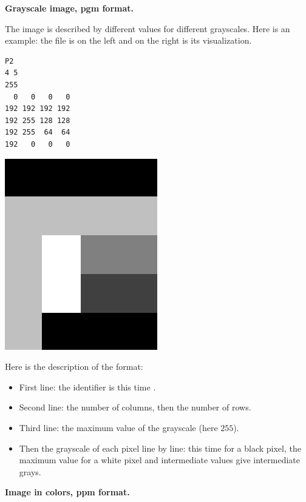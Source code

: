 \documentclass[11pt,class=report,crop=false]{standalone}
\begin{document}
\begin{cours}
\medskip

\textbf{Grayscale image, \og{}pgm\fg{} format.}

The image is described by different values for different grayscales.
Here is an example: the  file is on the left and on the right is its visualization.
\begin{center}
\begin{minipage}{0.3\textwidth}
\begin{lstlisting}
P2
4 5
255
  0   0   0   0
192 192 192 192
192 255 128 128
192 255  64  64
192   0   0   0
\end{lstlisting}
\end{minipage}
\begin{minipage}{0.3\textwidth}
\includegraphics[scale=\myscale,scale=0.2]{screen-lesson-image_gris}
\end{minipage}
\end{center}

Here is the description of the format:
\begin{itemize}
  \item First line: the identifier is this time .
  \item Second line: the number of columns, then the number of rows.
  \item Third line: the maximum value of the grayscale (here $255$).
  \item Then the grayscale of each pixel line by line: this time  for a black pixel, the maximum value for a white pixel and intermediate values give intermediate grays. 
\end{itemize}  

\medskip

\textbf{Image in colors, \og{}ppm\fg{} format.}



\end{cours}
\end{document}
